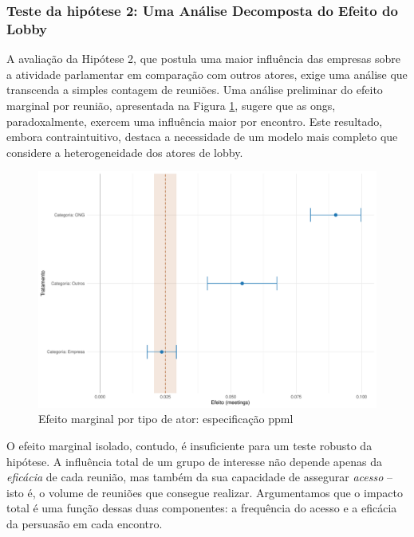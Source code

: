 \subsubsection{Teste da hipótese 2: Uma Análise Decomposta do Efeito do Lobby}

A avaliação da Hipótese 2, que postula uma maior influência das empresas sobre a atividade parlamentar em comparação com outros atores, exige uma análise que transcenda a simples contagem de reuniões. Uma análise preliminar do efeito marginal por reunião, apresentada na Figura \ref{fig:effect_linear_ppml_treatments}, sugere que as \acrshort{ong}s, paradoxalmente, exercem uma influência maior por encontro. Este resultado, embora contraintuitivo, destaca a necessidade de um modelo mais completo que considere a heterogeneidade dos atores de lobby.

\begin{figure}[htbp]
    \centering
    \includegraphics[width=\textwidth]{figures/h2_test/fig_coeff_treatments_overall.pdf}
    \caption{Efeito marginal por tipo de ator: especificação \acrshort{ppml}}
    \label{fig:effect_linear_ppml_treatments}
\end{figure}

O efeito marginal isolado, contudo, é insuficiente para um teste robusto da hipótese. A influência total de um grupo de interesse não depende apenas da \textit{eficácia} de cada reunião, mas também da sua capacidade de assegurar \textit{acesso} -- isto é, o volume de reuniões que consegue realizar. Argumentamos que o impacto total é uma função dessas duas componentes: a frequência do acesso e a eficácia da persuasão em cada encontro.

